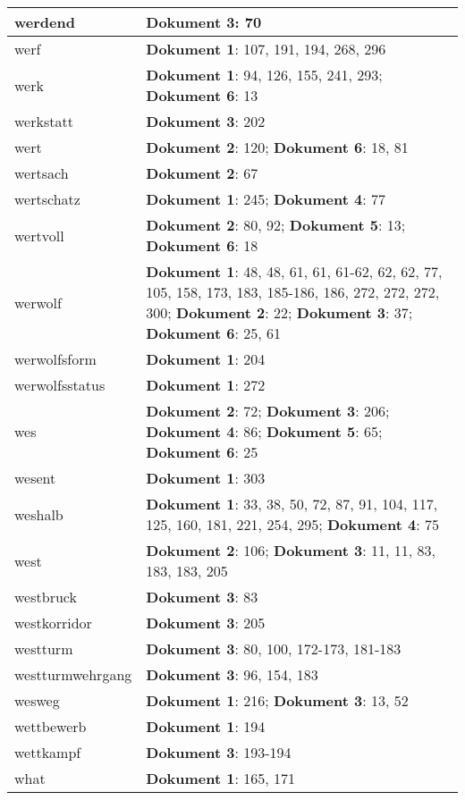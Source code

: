 \documentclass[a5paper]{article}
\begin{document}
\begin{longtable}[l]{|l|p{3in}|}
\hline
werdend & \textbf{Dokument 3}: 70 \\
\hline
werf & \textbf{Dokument 1}: 107, 191, 194, 268, 296 \\
\hline
werk & \textbf{Dokument 1}: 94, 126, 155, 241, 293; \textbf{Dokument 6}: 13 \\
\hline
werkstatt & \textbf{Dokument 3}: 202 \\
\hline
wert & \textbf{Dokument 2}: 120; \textbf{Dokument 6}: 18, 81 \\
\hline
wertsach & \textbf{Dokument 2}: 67 \\
\hline
wertschatz & \textbf{Dokument 1}: 245; \textbf{Dokument 4}: 77 \\
\hline
wertvoll & \textbf{Dokument 2}: 80, 92; \textbf{Dokument 5}: 13; \textbf{Dokument 6}: 18 \\
\hline
werwolf & \textbf{Dokument 1}: 48, 48, 61, 61, 61-62, 62, 62, 77, 105, 158, 173, 183, 185-186, 186, 272, 272, 272, 300; \textbf{Dokument 2}: 22; \textbf{Dokument 3}: 37; \textbf{Dokument 6}: 25, 61 \\
\hline
werwolfsform & \textbf{Dokument 1}: 204 \\
\hline
werwolfsstatus & \textbf{Dokument 1}: 272 \\
\hline
wes & \textbf{Dokument 2}: 72; \textbf{Dokument 3}: 206; \textbf{Dokument 4}: 86; \textbf{Dokument 5}: 65; \textbf{Dokument 6}: 25 \\
\hline
wesent & \textbf{Dokument 1}: 303 \\
\hline
weshalb & \textbf{Dokument 1}: 33, 38, 50, 72, 87, 91, 104, 117, 125, 160, 181, 221, 254, 295; \textbf{Dokument 4}: 75 \\
\hline
west & \textbf{Dokument 2}: 106; \textbf{Dokument 3}: 11, 11, 83, 183, 183, 205 \\
\hline
westbruck & \textbf{Dokument 3}: 83 \\
\hline
westkorridor & \textbf{Dokument 3}: 205 \\
\hline
westturm & \textbf{Dokument 3}: 80, 100, 172-173, 181-183 \\
\hline
westturmwehrgang & \textbf{Dokument 3}: 96, 154, 183 \\
\hline
wesweg & \textbf{Dokument 1}: 216; \textbf{Dokument 3}: 13, 52 \\
\hline
wettbewerb & \textbf{Dokument 1}: 194 \\
\hline
wettkampf & \textbf{Dokument 3}: 193-194 \\
\hline
what & \textbf{Dokument 1}: 165, 171 \\

\end{longtable}
\end{document}

